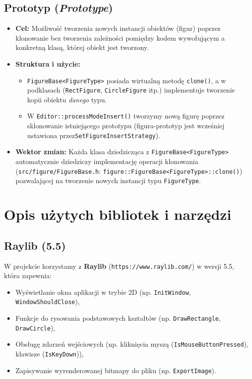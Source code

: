 \documentclass[a4paper,12pt]{article}
\begin{document}
\subsection{Prototyp (\emph{Prototype})}
\begin{itemize}
    \item \textbf{Cel:} Możliwość tworzenia nowych instancji obiektów (figur)
      poprzez klonowanie bez tworzenia zależności pomiędzy kodem wywołującym 
      a konkretną klasą, której obiekt jest tworzony.
    \item \textbf{Struktura i użycie:}
    \begin{itemize}
      \item \texttt{FigureBase<FigureType>} posiada wirtualną metodę \texttt{clone()},
      a w podklasach (\texttt{RectFigure}, \texttt{CircleFigure} itp.) implementuje 
      tworzenie kopii obiektu \emph{danego} typu.
      \item W \texttt{Editor::processModeInsert()} tworzymy nową figurę poprzez
      sklonowanie istniejącego prototypu (figura-prototyp jest wcześniej
      ustawiona przez\break \texttt{SetFigureInsertStrategy}).
    \end{itemize}
    \item \textbf{Wektor zmian:} Każda klasa dziedzicząca z \texttt{FigureBase<FigureType>}
      automatycznie dziedziczy implementację operacji klonowania (\verb|src/figure/FigureBase.h|: \verb|figure::FigureBase<FigureType>::clone()|) pozwalającej na tworzenie
    nowych instancji typu \texttt{FigureType}.
\end{itemize}

\section{Opis użytych bibliotek i narzędzi}

\subsection{Raylib (5.5)}
W projekcie korzystamy z \textbf{Raylib} (\verb|https://www.raylib.com/|) w wersji 5.5, która zapewnia:
\begin{itemize}
    \item Wyświetlanie okna aplikacji w trybie 2D (np. \texttt{InitWindow}, \texttt{WindowShouldClose}),
    \item Funkcje do rysowania podstawowych kształtów (np. \texttt{DrawRectangle}, \texttt{DrawCircle}),
    \item Obsługę zdarzeń wejściowych (np. kliknięcia myszą (\texttt{IsMouseButtonPressed}), klawisze (\texttt{IsKeyDown})),
    \item Zapisywanie wyrenderowanej bitmapy do pliku (np. \texttt{ExportImage}).
\end{itemize}
\end{document}
